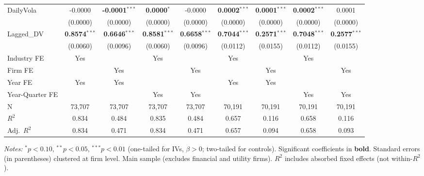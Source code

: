 \begin{landscape}
\begin{table}[H]
\begin{tabular}{lcccccccc}
DailyVola & -0.0000 & \textbf{-0.0001}$^{***}$ & \textbf{0.0000}$^{*}$ & -0.0000 & \textbf{0.0002}$^{***}$ & \textbf{0.0001}$^{***}$ & \textbf{0.0002}$^{***}$ & 0.0001 \\
 & (0.0000) & (0.0000) & (0.0000) & (0.0000) & (0.0000) & (0.0000) & (0.0000) & (0.0000) \\
Lagged\_DV & \textbf{0.8574}$^{***}$ & \textbf{0.6646}$^{***}$ & \textbf{0.8581}$^{***}$ & \textbf{0.6658}$^{***}$ & \textbf{0.7044}$^{***}$ & \textbf{0.2571}$^{***}$ & \textbf{0.7048}$^{***}$ & \textbf{0.2577}$^{***}$ \\
 & (0.0060) & (0.0096) & (0.0060) & (0.0096) & (0.0112) & (0.0155) & (0.0112) & (0.0155) \\
\midrule
Industry FE & Yes &  & Yes &  & Yes &  & Yes &  \\
Firm FE &  & Yes &  & Yes &  & Yes &  & Yes \\
Year FE & Yes & Yes &  &  & Yes & Yes &  &  \\
Year-Quarter FE &  &  & Yes & Yes &  &  & Yes & Yes \\
\midrule
N & 73,707 & 73,707 & 73,707 & 73,707 & 70,191 & 70,191 & 70,191 & 70,191 \\
$R^2$ & 0.834 & 0.484 & 0.835 & 0.484 & 0.657 & 0.116 & 0.658 & 0.116 \\
Adj.~$R^2$ & 0.834 & 0.471 & 0.834 & 0.471 & 0.657 & 0.094 & 0.658 & 0.093 \\
\bottomrule
\end{tabular}
\begin{minipage}{\linewidth}
\vspace{2pt}\scriptsize
\textit{Notes:} $^{*}p<0.10$, $^{**}p<0.05$, $^{***}p<0.01$ (one-tailed for IVs, $\beta > 0$; two-tailed for controls).
 Significant coefficients in \textbf{bold}.
 Standard errors (in parentheses) clustered at firm level.
 Main sample (excludes financial and utility firms).
 $R^2$ includes absorbed fixed effects (not within-$R^2$).
\end{minipage}
\end{table}
\end{landscape}